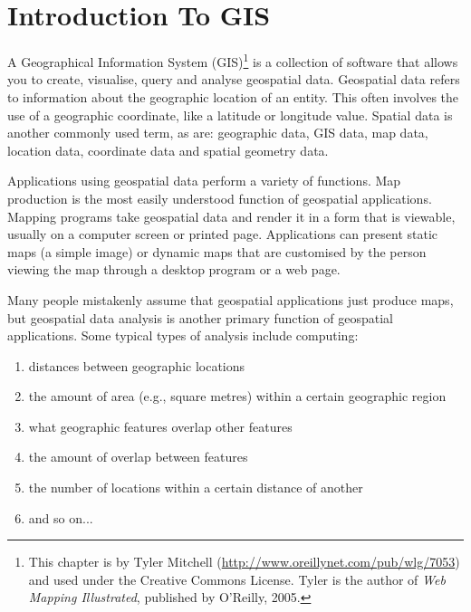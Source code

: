 
\section{Introduction To GIS}\label{label_intro}

\updatedisclaimer

A Geographical Information System (GIS)\cite{mitchel05}\footnote{This chapter is by Tyler
Mitchell (\url{http://www.oreillynet.com/pub/wlg/7053}) and
used under the Creative Commons License. Tyler is the author of 
\textit{Web Mapping Illustrated}, published by O'Reilly, 2005.}
is a collection of software that allows you to create, visualise, query and
analyse geospatial data. Geospatial data refers to information about the
geographic location of an entity. This often involves the use of a
geographic coordinate, like a latitude or longitude value. Spatial data is
another commonly used term, as are: geographic data, GIS data, map data,
location data, coordinate data and spatial geometry data.

Applications using geospatial data perform a variety of functions. Map
production is the most easily understood function of geospatial
applications. Mapping programs take geospatial data and render it in a form
that is viewable, usually on a computer screen or printed page.
Applications can present static maps (a simple image) or dynamic maps that
are customised by the person viewing the map through a desktop program or a
web page.

Many people mistakenly assume that geospatial applications just produce
maps, but geospatial data analysis is another primary function of
geospatial applications. Some typical types of analysis include computing:

\begin{enumerate}
\item distances between geographic locations
\item the amount of area (e.g., square metres) within a certain geographic
region
\item what geographic features overlap other features
\item the amount of overlap between features
\item the number of locations within a certain distance of another
\item and so on...
\end{enumerate}

